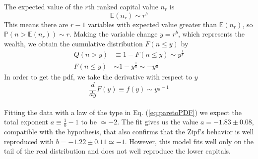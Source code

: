 The expected value of the $r$th ranked capital value $n_r$ is
\begin{equation*}
    \mathbb{E}(n_r)\sim r^b
\end{equation*}
This means there are $r - 1$ variables with expected value greater than $\mathbb{E}(n_r)$, so $\mathbb{P}(n > \mathbb{E}(n_r)) \sim r$.
Making the variable change $y=r^b$, which represents the wealth, we obtain the cumulative distribution $F(n \leq y)$ by
\begin{equation*}
    \begin{split}
        Q(n > y) &\equiv 1 - F(n \leq y) \sim y^{\frac{1}{b}} \\
        F(n \leq y) &\sim 1 - y^{\frac{1}{b}} \sim -y^{\frac{1}{b}}
    \end{split}
\end{equation*}
In order to get the pdf, we take the derivative with respect to $y$
\begin{equation}
    \frac{d}{dy}F(y) \equiv f(y) \sim y^{\frac{1}{b} - 1}
    \label{eq:paretoPDF}
\end{equation}
\\Fitting the data with a law of the type in Eq. (\ref{eq:paretoPDF}) we expect the total exponent $a \equiv \frac{1}{b} - 1$ to be $\simeq -2$.
The fit gives us the value $a = -1.83 \pm 0.08$, compatible with the hypothesis, that also confirms that the Zipf's behavior is well reproduced with $b = -1.22 \pm 0.11 \simeq -1$.
However, this model fits well only on the tail of the real distribution and does not well reproduce the lower capitals. \\ \\
